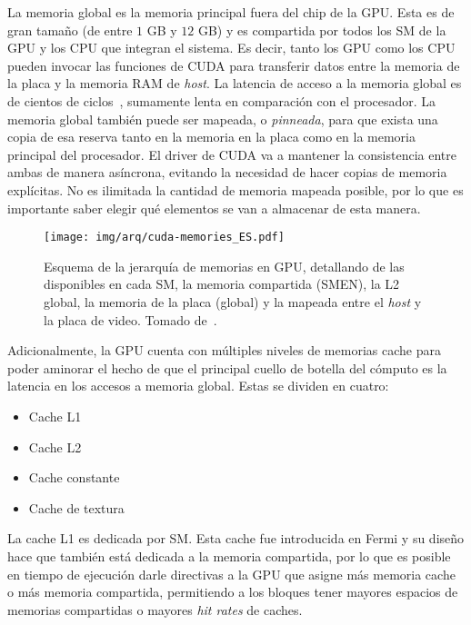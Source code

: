 La memoria global es la memoria principal fuera del chip de la GPU.
Esta es de gran tama\~no (de entre $1$ GB y $12$ GB) y es compartida por todos los SM de la GPU y los CPU que integran el sistema.
Es decir, tanto los GPU como los CPU pueden invocar las funciones de CUDA para transferir datos entre la memoria de la placa y la memoria RAM de \textit{host}.
La latencia de acceso a la memoria global es de cientos de ciclos~\cite{Demystifying}, sumamente lenta en comparaci\'on con el procesador.
La memoria global tambi\'en puede ser mapeada, o \textit{pinneada}, para que exista una copia de esa reserva tanto en la memoria en la placa como en la memoria principal del procesador. El driver de CUDA va a mantener la consistencia entre ambas de manera as\'incrona, evitando la necesidad de hacer copias de memoria expl\'icitas.
No es ilimitada la cantidad de memoria mapeada posible, por lo que es importante saber elegir qu\'e elementos se van a almacenar de esta manera.

\begin{figure}[htb]
    \centering
    \texttt{[image: img/arq/cuda-memories\_ES.pdf]}
    \caption{Esquema de la jerarqu\'ia de memorias en GPU, detallando de las disponibles en cada SM, la memoria compartida (SMEN), la L2 global, la
    memoria de la placa (global) y la mapeada entre el \textit{host} y la placa de video. Tomado de~\cite{farberCuda}.}
    \label{fig:cuda-memories}
\end{figure}

Adicionalmente, la GPU cuenta con m\'ultiples niveles de memorias cache para poder aminorar el hecho de que el principal cuello de botella del c\'omputo es la latencia en los accesos a memoria global.
Estas se dividen en cuatro:

\begin{itemize}
  \item Cache L1
  \item Cache L2
  \item Cache constante
  \item Cache de textura
\end{itemize}

La cache L1 es dedicada por SM.
Esta cache fue introducida en Fermi y su dise\~no hace que tambi\'en est\'a dedicada a la memoria compartida, por lo que es posible en tiempo de ejecuci\'on darle directivas a la GPU que asigne m\'as memoria cache o m\'as memoria compartida, permitiendo a los bloques tener mayores espacios de memorias compartidas o mayores \textit{hit rates} de caches.

